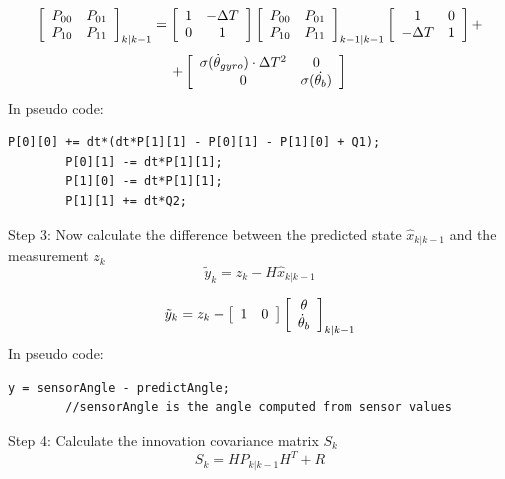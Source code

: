 \documentclass[a4paper]{report}
\begin{document}
		\begin{equation*}
		\left[
		\begin{array}{c c}
		P_{00}	&	P_{01}\\
		P_{10}	&	P_{11}
		\end{array} \right]_{k|k-1}
		=
		\left[
		\begin{array}{c c}
		1 & - \Delta T\\
		0 & 1
		\end{array} \right]
		\left[
		\begin{array}{c c}
		P_{00}	&	P_{01}\\
		P_{10}	&	P_{11}
		\end{array} \right]_{k-1|k-1}
		\left[
		\begin{array}{c c}
		1	&	0\\
		- \Delta T & 1
		\end{array} \right]
		+
		\end{equation*}
		\begin{equation}
		+
		\left[
		\begin{array}{c c}
		\sigma(\dot{\theta}_{gyro})\cdot\Delta T^{2}	&	0\\
		0	&	 \sigma(\dot{\theta_{b}})
		\end{array} \right]
		\end{equation}
    In pseudo code:
		\begin{lstlisting}[frame=single]
		P[0][0] += dt*(dt*P[1][1] - P[0][1] - P[1][0] + Q1);
		P[0][1] -= dt*P[1][1];
		P[1][0] -= dt*P[1][1];
		P[1][1] += dt*Q2;
		\end{lstlisting}
		Step 3: Now calculate the difference between the predicted state $\hat{x}_{k|k-1}$ and the measurement $z_{k}$
		\begin{equation}
		\tilde{y}_{k}=z_{k}-H\hat{x}_{k|k-1}
		\end{equation}

		\begin{equation}
		\tilde{y}_{k}=z_{k}-\left[
		\begin{array}{c c}
		1	&	0
		\end{array} \right]
		\left[
		\begin{array}{c}
		\theta \\
		\dot{\theta}_{b}
		\end{array} \right]_{k|k-1}
		\end{equation}
    In pseudo code:
		\begin{lstlisting}[frame=single]
		y = sensorAngle - predictAngle;
		//sensorAngle is the angle computed from sensor values
		\end{lstlisting}
		Step 4: Calculate the innovation covariance matrix $S_{k}$
		\begin{equation}
		S_{k}=HP_{k|k-1}H^{T}+R
		\end{equation}
\end{document}
